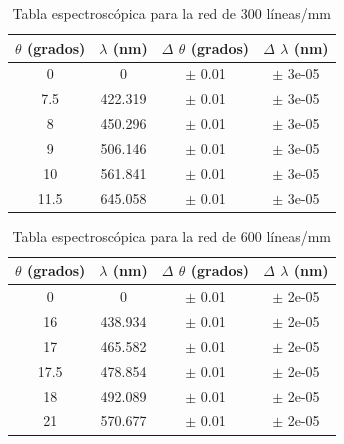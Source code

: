 \documentclass[11pt, a4paper, twocolumn]{article}
\begin{document}
\vspace{0.5cm}
\begin{table}[H]
    \caption{Tabla espectroscópica para la red de 300 líneas/mm}
    \centering
    \small
    \setlength{\tabcolsep}{4pt}
    \begin{tabular}{cccc}
        \hline
        $\theta$ (grados) &   $\lambda$ (nm) & $\Delta$ $\theta$ (grados)   & $\Delta$ $\lambda$ (nm)   \\
        \hline
                        0   &            0     & $\pm$ 0.01                     & $\pm$ 3e-05                 \\
                        7.5 &          422.319 & $\pm$ 0.01                     & $\pm$ 3e-05                 \\
                        8   &          450.296 & $\pm$ 0.01                     & $\pm$ 3e-05                 \\
                        9   &          506.146 & $\pm$ 0.01                     & $\pm$ 3e-05                 \\
                        10   &          561.841 & $\pm$ 0.01                     & $\pm$ 3e-05                 \\
                        11.5 &          645.058 & $\pm$ 0.01                     & $\pm$ 3e-05                 \\
        \hline
    \end{tabular}
    
\end{table}

\vspace{0.5cm}

\begin{table}[H]
    \caption{Tabla espectroscópica para la red de 600 líneas/mm}
    \centering
    \small
    \setlength{\tabcolsep}{4pt}
    \begin{tabular}{cccc}
        \hline
        $\theta$ (grados) &   $\lambda$ (nm) & $\Delta$ $\theta$ (grados)   & $\Delta$ $\lambda$ (nm)   \\
        \hline
                        0   &            0     & $\pm$ 0.01                     & $\pm$ 2e-05                 \\
                        16   &          438.934 & $\pm$ 0.01                     & $\pm$ 2e-05                 \\
                        17   &          465.582 & $\pm$ 0.01                     & $\pm$ 2e-05                 \\
                        17.5 &          478.854 & $\pm$ 0.01                     & $\pm$ 2e-05                 \\
                        18   &          492.089 & $\pm$ 0.01                     & $\pm$ 2e-05                 \\
                        21   &          570.677 & $\pm$ 0.01                     & $\pm$ 2e-05                 \\
        \hline
    \end{tabular}
\end{table}
\end{document}
